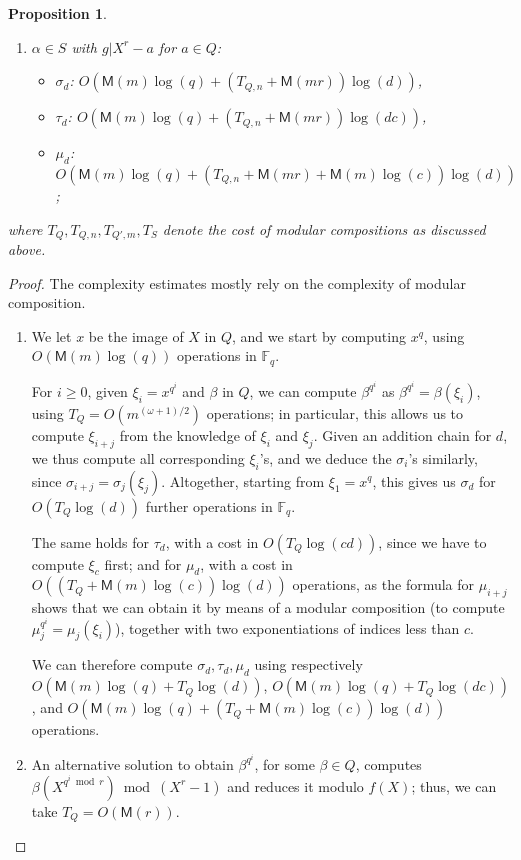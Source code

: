 \documentclass[12pt]{article}
\theoremstyle{plain}
\newtheorem{proposition}[theorem]{Proposition}
\theoremstyle{definition}
\def\F{\ensuremath{\mathbb{F}}}
\def\MM{\ensuremath{\mathsf{M}}}
\begin{document}
\begin{proposition}
\begin{enumerate}[label=\textbf{Case~\theenumi.},leftmargin=*, align=left]
\item $\alpha \in S$ with $g | X^r - a$ for $a \in Q$:
\begin{itemize}
\item
$\sigma_d$: $O(\MM(m)\log(q) + (T_{Q,n}+ \MM(mr))\log(d))$,
\item
$\tau_d$: $O(\MM(m)\log(q) + (T_{Q,n} + \MM(mr))\log(d c))$,
\item
$\mu_d$: $O(\MM(m)\log(q) + (T_{Q,n} + \MM(mr) + \MM(m)\log(c))\log(d))$;
\end{itemize}
\end{enumerate}
where $T_Q, T_{Q,n}, T_{Q',m}, T_S$ denote the cost of modular compositions
as discussed above.
\end{proposition}

\begin{proof}
The complexity estimates mostly rely on the complexity of modular composition.
\begin{enumerate}[label=\textbf{Case~\theenumi.},leftmargin=*, align=left]
\item
  We let $x$ be the image of $X$ in $Q$, and we
  start by computing $x^q$, using $O(\MM(m)\log(q))$ operations in
  $\F_q$.

  For $i \ge 0$, given $\xi_i = x^{q^i}$ and $\beta$ in $Q$, we can
  compute $\beta^{q^i}$ as $\beta^{q^i}=\beta(\xi_i)$, using
  $T_Q=O(m^{(\omega+1)/2})$ operations; in particular, this allows us to
  compute $\xi_{i+j}$ from the knowledge of $\xi_i$ and $\xi_j$. Given
  an addition chain for $d$, we thus compute all corresponding
  $\xi_i$'s, and we deduce the $\sigma_i$'s similarly, since
  $\sigma_{i+j}=\sigma_j(\xi_j)$. Altogether, starting from
  $\xi_1=x^q$, this gives us $\sigma_d$ for $O(T_Q\log(d))$
  further operations in $\F_q$.

  The same holds for $\tau_d$, with a cost in $O(T_Q\log(cd))$,
  since we have to compute $\xi_c$ first;
  and for $\mu_d$, with a cost in
  $O((T_Q + \MM(m)\log(c))\log(d))$ operations,
  as the formula for $\mu_{i+j}$ shows that
  we can obtain it by means of a modular composition
  (to compute $\mu_j^{q^i}=\mu_j(\xi_i)$), together with
  two exponentiations of indices less than $c$.

  We can therefore compute $\sigma_d, \tau_d, \mu_d$ using respectively
  $O(\MM(m) \log(q) + T_Q \log(d))$,
  $O(\MM(m) \log(q) + T_Q \log(d c))$,
  and $O(\MM(m) \log(q) + (T_Q + \MM(m)\log(c))\log(d))$ operations.

\item
  An alternative solution to obtain $\beta^{q^i}$, for some $\beta \in
  Q$, computes $\beta(X^{q^i \bmod r}) \bmod (X^r-1)$ and reduces it
  modulo $f(X)$; thus, we can take $T_Q=O(\MM(r))$.
  

\end{enumerate}
\end{proof}
\end{document}
